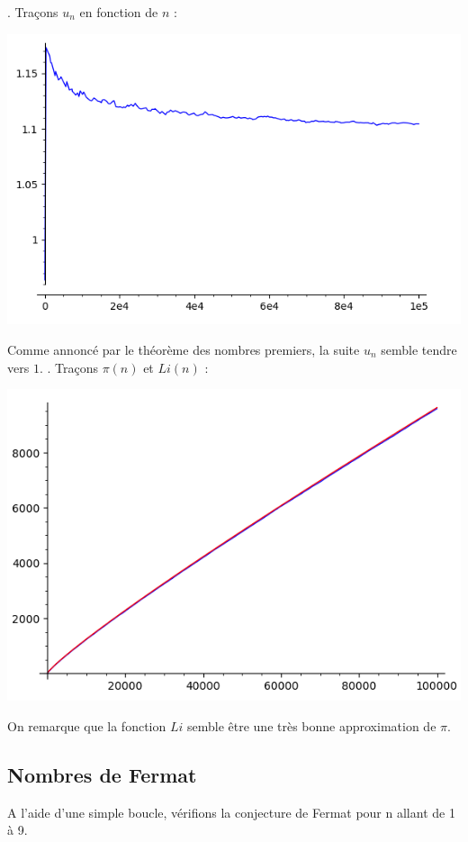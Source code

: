 \documentclass[titlepage]{article}
\begin{document}
    . Traçons $u_n$ en fonction de $n$ : 
    \begin{center}
        \includegraphics[scale=0.5]{Ressources/2022-04-27-10:20:31-screenshot.png}
    \end{center}
    Comme annoncé par le théorème des nombres premiers, la suite $u_n$ semble tendre vers $1$.
    . Traçons $\pi(n)$ et $Li(n)$ :
    \begin{center}
        \includegraphics[scale=0.5]{Ressources/2022-05-10-10:43:46-screenshot.png}
    \end{center}
    On remarque que la fonction $Li$ semble être une très bonne approximation de $\pi$.

    \subsection{Nombres de Fermat}
    A l'aide d'une simple boucle, vérifions la conjecture de Fermat pour n allant de 1 à 9.
\end{document}
